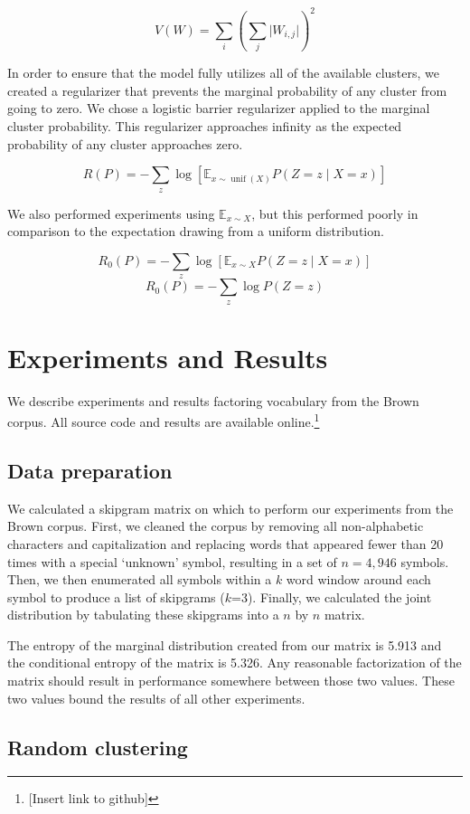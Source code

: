 \documentclass[11pt,letterpaper]{article}
\begin{document}
$$V(W) = \sum_i (\sum_j \lvert W_{i,j} \rvert)^2$$ 

In order to ensure that the model fully utilizes all of the available clusters, we created a regularizer that prevents the marginal probability of any cluster from going to zero. We chose a logistic barrier regularizer applied to the marginal cluster probability. This regularizer approaches infinity as the expected probability of any cluster approaches zero.

$$ R(P) = -\sum_z \log[ \mathbb{E}_{x \sim \operatorname{unif}(X)} P(Z=z \mid X=x)]$$ 

We also performed experiments using $\mathbb{E}_{x \sim X}$, but this performed poorly in comparison to the expectation drawing from a uniform distribution.

$$R_0(P) =  -\sum_z \log [ \mathbb{E}_{x \sim X} P(Z=z \mid X=x) ]$$ 
$$R_0(P) =  -\sum_z \log P(Z=z )$$ 

\section{Experiments and Results}

We describe experiments and results factoring vocabulary from the Brown corpus. All source code and results are available online.\footnote{[Insert link to github]}

\subsection{Data preparation}

We calculated a skipgram matrix on which to perform our experiments from the Brown corpus. First, we cleaned the corpus by removing all non-alphabetic characters and capitalization and replacing words that appeared fewer than 20 times with a special `unknown' symbol, resulting in a set of $n=4,946$ symbols. Then, we then enumerated all symbols within a $k$ word window around each symbol to produce a list of skipgrams ($k$=3). Finally, we calculated the joint distribution by tabulating these skipgrams into a $n$ by $n$ matrix.

The entropy of the marginal distribution created from our matrix is 5.913 and the conditional entropy of the matrix is 5.326. Any reasonable factorization of the matrix should result in performance somewhere between those two values. These two values bound the results of all other experiments.

\subsection{Random clustering}
\end{document}
